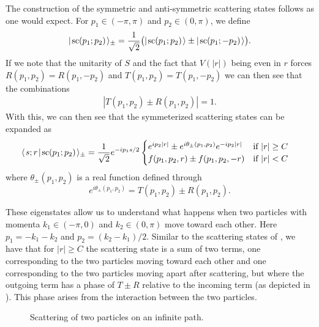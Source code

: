 \documentclass[../thesis-main/thesis-main]{subfiles}
\begin{document}



The construction of the symmetric and anti-symmetric scattering states follows as one would expect. For $p_1\in (-\pi,\pi)$ and $p_2\in (0,\pi)$, we define
\begin{align}
  |\mspace{2mu} \mathrm{sc}(p_1;p_2) \mspace{2mu} \rangle_\pm = \frac{1}{\sqrt2}\big(|\mspace{2mu} \mathrm{sc}(p_1;p_2) \mspace{2mu} \rangle \pm |\mspace{2mu} \mathrm{sc}(p_1;-p_2) \mspace{2mu} \rangle\big).
\end{align}
If we note that the unitarity of $S$ and the fact that $V(|r|)$ being even in $r$ forces $R(p_1,p_2) = R(p_1,-p_2)$ and $T(p_1,p_2)  = T(p_1,-p_2)$ we can then see that the combinations
\begin{align}
  |T(p_1,p_2) \pm R(p_1,p_2)| = 1.  
\end{align}
With this, we can then see that the symmeterized scattering states can be expanded as
\begin{align}
    \langle\mspace{2mu} s;r \mspace{2mu} | \mspace{2mu} \mathrm{sc}(p_1;p_2)\mspace{2mu} \rangle_\pm
      &= \frac{1}{\sqrt{2}}e^{-i p_1 s/2} \begin{cases}  e^{i p_2 |r|} \pm e^{i\theta_{\pm}(p_1,p_2)} e^{-i p_2 |r|} &  \text{if } |r| \geq C\\
  	f(p_1,p_2,r) \pm f(p_1,p_2,-r) & \text{if }  |r| < C\end{cases}
\label{eq:symscatter}
\end{align}
where $\theta_{\pm}(p_1,p_2)$ is a real function defined through
\begin{equation}
e^{i\theta_{\pm}(p_1,p_2)}= T(p_1,p_2)\pm R(p_1,p_2). \label{eq:delta_pm}
\end{equation}


These eigenstates allow us to understand what happens when two particles with momenta $k_1\in(-\pi,0)$ and $k_2\in(0,\pi)$ move toward each other. Here $p_1=-k_1-k_2$ and $p_2=(k_2-k_1)/2$.  Similar to the scattering states of , we have that for $|r|\geq C$ the scattering state is a sum of two terms, one corresponding to the two particles moving toward each other and one corresponding to the two particles moving apart after scattering, but where the outgoing term has a  phase of $T\pm R$ relative to the incoming term (as depicted in ). This phase arises from the interaction between the two particles.



\begin{figure}
  \centering
  
  \caption{Scattering of two particles on an infinite path.}
  \label{fig:wte}
\end{figure}
\end{document}

